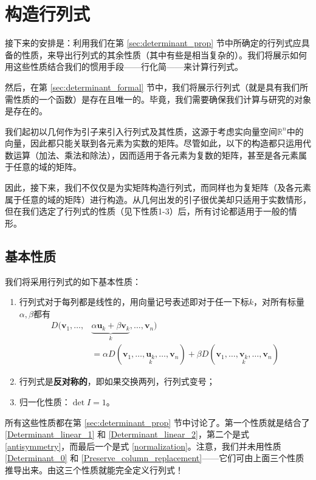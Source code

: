 \section{构造行列式}\label{sec:construct_det}

接下来的安排是：利用我们在第 \ref{sec:determinant_prop} 节中所确定的行列式应具备的性质，来导出行列式的其余性质（其中有些是相当复杂的）。我们将展示如何用这些性质结合我们的惯用手段——行化简——来计算行列式。

然后，在第 \ref{sec:determinant_formal} 节中，我们将展示行列式（就是具有我们所需性质的一个函数）是存在且唯一的。毕竟，我们需要确保我们计算与研究的对象是存在的。

我们起初以几何作为引子来引入行列式及其性质，这源于考虑实向量空间$\mathbb{R}^n$中的向量，因此都只能关联到各元素为实数的矩阵。尽管如此，以下的构造都只运用代数运算（加法、乘法和除法），因而适用于各元素为复数的矩阵，甚至是各元素属于任意的域的矩阵。

因此，接下来，我们不仅仅是为实矩阵构造行列式，而同样也为复矩阵（及各元素属于任意的域的矩阵）进行构造。从几何出发的引子很优美却只适用于实数情形，但在我们选定了行列式的性质（见下性质1-3）后，所有讨论都适用于一般的情形。

\subsection{基本性质}\label{subsec:basic_prop}

我们将采用行列式的如下基本性质：

\begin{enumerate}
  \item 行列式对于每列都是线性的，用向量记号表述即对于任一下标$k$，对所有标量$\alpha,\beta$都有
  \[\begin{aligned}
    D(\mathbf{v}_{1},\ldots,&\underbrace{\alpha\mathbf{u}_{k}+\beta\mathbf{v}_{k}}_{k},\ldots,\mathbf{v}_{n})\\&=\alpha D(\mathbf{v}_{1},\ldots,\underset{k}{\mathbf{u}_{k}},\ldots,\mathbf{v}_{n})+\beta D(\mathbf{v}_{1},\ldots,\underset{k}{\mathbf{v}_{k}},\ldots,\mathbf{v}_{n})
  \end{aligned}\]
  \item 行列式是{\bf 反对称的}，即如果交换两列，行列式变号；
  \item 归一化性质：$\det I=1$。
\end{enumerate}

所有这些性质都在第 \ref{sec:determinant_prop} 节中讨论了。第一个性质就是结合了 \eqref{Determinant_linear_1} 和 \eqref{Determinant_linear_2}，第二个是式 \eqref{antisymmetry}，而最后一个是式 \eqref{normalization}。注意，我们并未用性质 \eqref{Determinant_0} 和 \eqref{Preserve_column_replacement}——它们可由上面三个性质推导出来。由这三个性质就能完全定义行列式！

